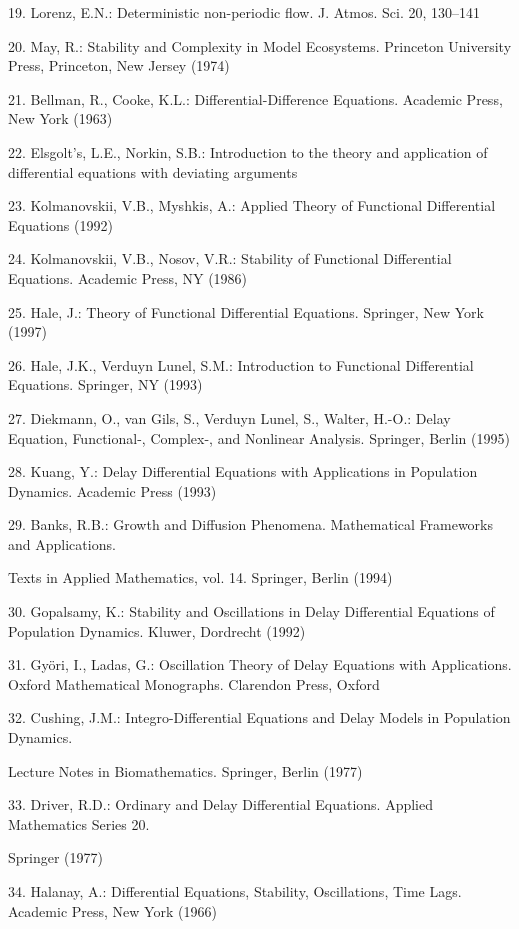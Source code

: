 \documentclass[12pt]{article}
\begin{document}
19. Lorenz, E.N.: Deterministic non-periodic ﬂow. J. Atmos. Sci. 20, 130–141

20. May, R.: Stability and Complexity in Model Ecosystems. Princeton University Press, Princeton, New Jersey (1974)

21. Bellman, R., Cooke, K.L.: Differential-Difference Equations. Academic Press, New York (1963)

22. Elsgolt’s, L.E., Norkin, S.B.: Introduction to the theory and application of differential equations with deviating arguments

23. Kolmanovskii, V.B., Myshkis, A.: Applied Theory of Functional Differential Equations (1992)

24. Kolmanovskii, V.B., Nosov, V.R.: Stability of Functional Differential Equations. Academic Press, NY (1986)

25. Hale, J.: Theory of Functional Differential Equations. Springer, New York (1997)

26. Hale, J.K., Verduyn Lunel, S.M.: Introduction to Functional Differential Equations. Springer, NY (1993)

27. Diekmann, O., van Gils, S., Verduyn Lunel, S., Walter, H.-O.: Delay Equation, Functional-, Complex-, and Nonlinear Analysis. Springer, 
Berlin (1995)

28. Kuang, Y.: Delay Differential Equations with Applications in Population Dynamics. Academic Press (1993)

29. Banks, R.B.: Growth and Diffusion Phenomena. Mathematical Frameworks and Applications.

Texts in Applied Mathematics, vol. 14. Springer, Berlin (1994)

30. Gopalsamy, K.: Stability and Oscillations in Delay Differential Equations of Population Dynamics. Kluwer, Dordrecht (1992)

31. Györi, I., Ladas, G.: Oscillation Theory of Delay Equations with Applications. Oxford Mathematical Monographs. Clarendon Press, Oxford

32. Cushing, J.M.: Integro-Differential Equations and Delay Models in Population Dynamics.

Lecture Notes in Biomathematics. Springer, Berlin (1977)

33. Driver, R.D.: Ordinary and Delay Differential Equations. Applied Mathematics Series 20.

Springer (1977)

34. Halanay, A.: Differential Equations, Stability, Oscillations, Time Lags. Academic Press, New York (1966)
\end{document}
